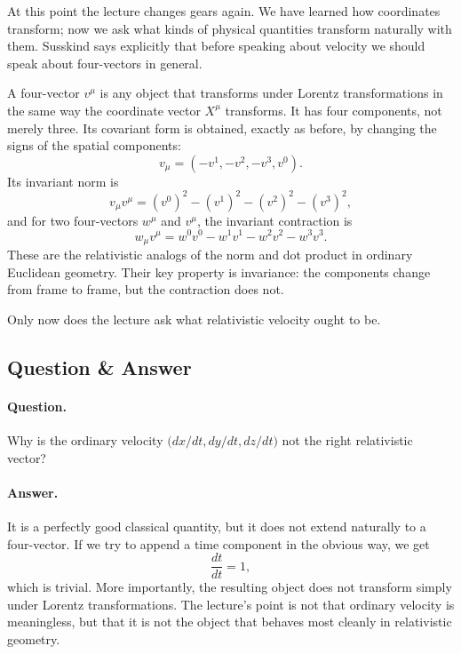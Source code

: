 At this point the lecture changes gears again. We have learned how coordinates transform; now we ask what kinds of physical quantities transform naturally with them. Susskind says explicitly that before speaking about velocity we should speak about four-vectors in general.

A four-vector \(v^\mu\) is any object that transforms under Lorentz transformations in the same way the coordinate vector \(X^\mu\) transforms. It has four components, not merely three. Its covariant form is obtained, exactly as before, by changing the signs of the spatial components:
\begin{equation}
v_\mu = (-v^1,-v^2,-v^3,v^0).
\end{equation}
Its invariant norm is
\begin{equation}
v_\mu v^\mu = (v^0)^2-(v^1)^2-(v^2)^2-(v^3)^2,
\end{equation}
and for two four-vectors \(w^\mu\) and \(v^\mu\), the invariant contraction is
\begin{equation}
w_\mu v^\mu = w^0v^0-w^1v^1-w^2v^2-w^3v^3.
\end{equation}
These are the relativistic analogs of the norm and dot product in ordinary Euclidean geometry. Their key property is invariance: the components change from frame to frame, but the contraction does not.

Only now does the lecture ask what relativistic velocity ought to be.

\subsection{Question \& Answer}

\paragraph{Question.}
Why is the ordinary velocity \(\bigl(dx/dt,dy/dt,dz/dt\bigr)\) not the right relativistic vector?

\paragraph{Answer.}
It is a perfectly good classical quantity, but it does not extend naturally to a four-vector. If we try to append a time component in the obvious way, we get
\begin{equation}
\frac{dt}{dt}=1,
\end{equation}
which is trivial. More importantly, the resulting object does not transform simply under Lorentz transformations. The lecture's point is not that ordinary velocity is meaningless, but that it is not the object that behaves most cleanly in relativistic geometry.

